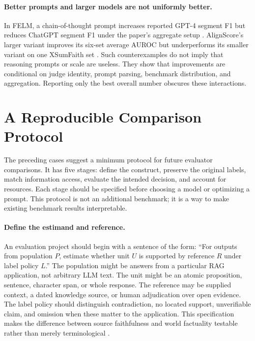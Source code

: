 \documentclass[11pt]{article}
\begin{document}
\paragraph{Better prompts and larger models are not uniformly better.} In FELM, a chain-of-thought prompt increases reported GPT-4 segment F1 but reduces ChatGPT segment F1 under the paper's aggregate setup \citep{C13}. AlignScore's larger variant improves its six-set average AUROC but underperforms its smaller variant on one XSumFaith set \citep{C09}. Such counterexamples do not imply that reasoning prompts or scale are useless. They show that improvements are conditional on judge identity, prompt parsing, benchmark distribution, and aggregation. Reporting only the best overall number obscures these interactions.

\section{A Reproducible Comparison Protocol}
The preceding cases suggest a minimum protocol for future evaluator comparisons. It has five stages: define the construct, preserve the original labels, match information access, evaluate the intended decision, and account for resources. Each stage should be specified before choosing a model or optimizing a prompt. This protocol is not an additional benchmark; it is a way to make existing benchmark results interpretable.

\paragraph{Define the estimand and reference.} An evaluation project should begin with a sentence of the form: ``For outputs from population $P$, estimate whether unit $U$ is supported by reference $R$ under label policy $L$.'' The population might be answers from a particular RAG application, not arbitrary LLM text. The unit might be an atomic proposition, sentence, character span, or whole response. The reference may be supplied context, a dated knowledge source, or human adjudication over open evidence. The label policy should distinguish contradiction, no located support, unverifiable claim, and omission when these matter to the application. This specification makes the difference between source faithfulness and world factuality testable rather than merely terminological \citep{I041,C16}.
\end{document}

